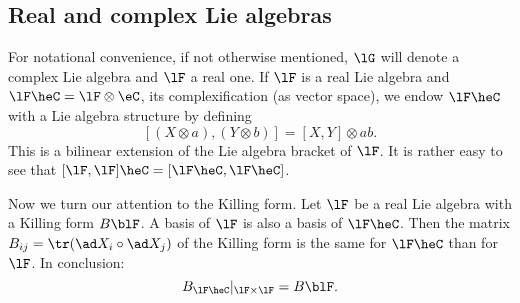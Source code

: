 \subsection{Real and complex Lie algebras}

For notational convenience, if not otherwise mentioned, $\lG$ will denote a complex Lie algebra and $\lF$ a real one. If $\lF$ is a real Lie algebra and $\lF\heC=\lF\otimes\eC$, its complexification (as vector space), we endow $\lF\heC$ with a Lie algebra structure by defining
\[
  [ (X\otimes a),(Y\otimes b)  ]=[X,Y]\otimes ab.
\]
This is a bilinear extension of the Lie algebra bracket of $\lF$. It is rather easy to see that $[\lF,\lF]\heC=[\lF\heC,\lF\heC]$.

Now we turn our attention to the Killing form. Let $\lF$ be a real Lie algebra with a Killing form $B\blF$. A basis of $\lF$ is also a basis of $\lF\heC$. Then the matrix $B_{ij}=\tr( \ad X_i\circ\ad X_j )$ of the Killing form is the same for $\lF\heC$ than for $\lF$. In conclusion:
\[
   B_{\lF\heC}|_{\lF\times\lF}=B\blF.
\]

